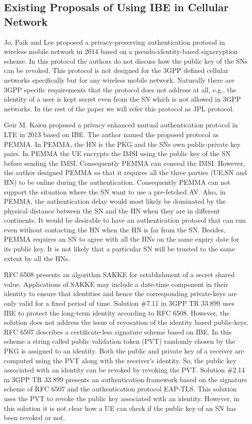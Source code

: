 \documentclass{river-journal}
\begin{document}
\subsection{Existing Proposals of Using IBE in Cellular Network}
Jo, Paik and Lee proposed a privacy-preserving authentication protocol in wireless mobile network in 2014 \cite{IEE_transactions_mobile_computing_2014} based on a pseudo-identity-based signcryption scheme. In this protocol the authors do not discuss how the public key of the SNs can be revoked. This protocol is not designed for the 3GPP defined cellular networks specifically but for any wireless mobile network. Naturally there are 3GPP specific requirements that the protocol does not address at all, e.g., the identity of a user is kept secret even from the SN which is not allowed in 3GPP networks. In the rest of the paper we will refer this protocol as JPL protocol.

Geir M. K{\o}ien proposed a privacy enhanced mutual authentication protocol in LTE in 2013 \cite{koienibe} based on IBE. The author named the proposed protocol as PEMMA. In PEMMA, the HN is the PKG and the SNs own public-private key pairs. In PEMMA the UE encrypts the IMSI using the public key of the SN before sending the IMSI. Consequently PEMMA can conceal the IMSI. However, the author designed PEMMA so that it requires all the three parties (UE,SN and HN) to be online during the authentication. Consequently PEMMA can not support the situation where the SN want to use a pre-fetched AV. Also, in PEMMA, the authentication delay would most likely be dominated by the physical distance between the SN and the HN when they are in different continents. It would be desirable to have an authentication protocol that can run even without contacting the HN when the HN is far from the SN. Besides, PEMMA requires an SN to agree with all the HNs on the same expiry date for its public key. It is not likely that a particular SN will be trusted to the same extent by all the HNs.

RFC 6508 \cite{RFC6508} presents an algorithm SAKKE for establishment of a secret shared value. Applications of SAKKE may include a date-time component in their identity to ensure that identities and hence the corresponding private-keys are only valid for a fixed period of time. Solution \#7.11 in 3GPP TR 33.899 \cite{TR33899} uses IBE to protect the long-term identity according to RFC 6508. However, the solution does not address the issue of revocation of the identity based public-keys. RFC 6507 \cite{RFC6507} describes a certificate-less signature scheme based on IBE. In this scheme a string called public validation token (PVT) randomly chosen by the PKG is assigned to an identity. Both the public and private key of a receiver are computed using the PVT along with the receiver's identity. So, the public key associated with an identity can be revoked by revoking the PVT. Solution \#2.14 in 3GPP TR 33.899 presents an authentication framework based on the signature scheme of RFC 6507 and the authentication protocol EAP-TLS. This solution uses the PVT to revoke the public key associated with an identity. However, in this solution it is not clear how a UE can check if the public key of an SN has been revoked or not.
\end{document}
